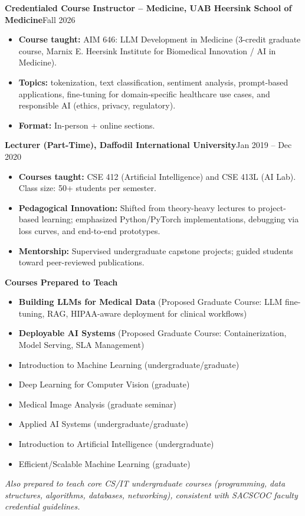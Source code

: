 \documentclass[11pt]{article}
\newcommand{\cventry}[3]{%
  \noindent\textbf{#1}\hfill #2\\
  \noindent #3 \par
}
\begin{document}
\cventry
{Credentialed Course Instructor -- Medicine, UAB Heersink School of Medicine}
{Fall 2026}
{\vspace{-15pt}%
\begin{itemize}
  \item \textbf{Course taught:} AIM 646: LLM Development in Medicine (3-credit graduate course, Marnix E. Heersink Institute for Biomedical Innovation / AI in Medicine).
  \item \textbf{Topics:} tokenization, text classification, sentiment analysis, prompt-based applications, fine-tuning for domain-specific healthcare use cases, and responsible AI (ethics, privacy, regulatory).
  \item \textbf{Format:} In-person + online sections.
\end{itemize}
}

\cventry
{Lecturer (Part-Time), Daffodil International University}
{Jan 2019 -- Dec 2020}
{\vspace{-15pt}%
\begin{itemize}
  \item \textbf{Courses taught:} CSE 412 (Artificial Intelligence) and CSE 413L (AI Lab). Class size: 50+ students per semester.
  \item \textbf{Pedagogical Innovation:} Shifted from theory-heavy lectures to project-based learning; emphasized Python/PyTorch implementations, debugging via loss curves, and end-to-end prototypes.
  \item \textbf{Mentorship:} Supervised undergraduate capstone projects; guided students toward peer-reviewed publications.
\end{itemize}
}
\textbf{Courses Prepared to Teach}
\begin{itemize}[nosep]
  \item \textbf{Building LLMs for Medical Data} (Proposed Graduate Course: LLM fine-tuning, RAG, HIPAA-aware deployment for clinical workflows)
  \item \textbf{Deployable AI Systems} (Proposed Graduate Course: Containerization, Model Serving, SLA Management)
  \item Introduction to Machine Learning (undergraduate/graduate)
  \item Deep Learning for Computer Vision (graduate)
  \item Medical Image Analysis (graduate seminar)
  \item Applied AI Systems (undergraduate/graduate)
  \item Introduction to Artificial Intelligence (undergraduate)
  \item Efficient/Scalable Machine Learning (graduate)
\end{itemize}
\noindent\textit{Also prepared to teach core CS/IT undergraduate courses (programming, data structures, algorithms, databases, networking), consistent with SACSCOC faculty credential guidelines.}
\end{document}
